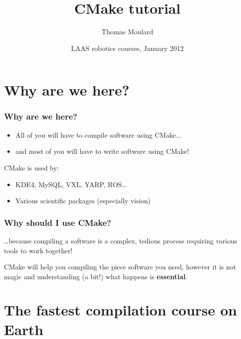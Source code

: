 \documentclass[hyperref={pdfpagelabels=false}]{beamer}
\title{CMake tutorial}
\author[T. Moulard]{Thomas Moulard}
\date[January 2012]{LAAS robotics courses, January 2012}
\begin{document}
\maketitle

\section{Why are we here?}

\begin{frame}
\frametitle{Why are we here?}

\begin{itemize}
  \item All of you will have to compile software using CMake...
  \item and most of you will have to write software using CMake!
\end{itemize}

\vspace{1cm}

CMake is used by:
\begin{itemize}
  \item KDE4, MySQL, VXL, YARP, ROS\ldots
  \item Various scientific packages (especially vision)
\end{itemize}
\end{frame}


\begin{frame}
\frametitle{Why should I use CMake?}

\ldots because compiling a software is a complex, tedious process
requiring various tools to work together!

\vspace{1cm}

CMake will help you compiling the piece software you need, however it
is not magic and understanding (a bit!) what happens is
\textbf{essential}.

\end{frame}


\section{The fastest compilation course on Earth}
\end{document}
